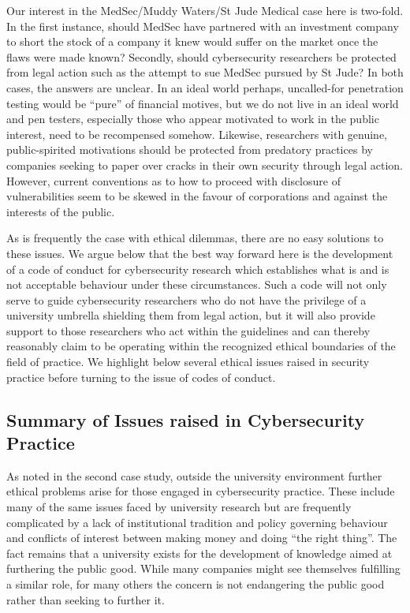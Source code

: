 \documentclass{svjour3}                     %
\begin{document}
Our interest in the MedSec/Muddy Waters/St Jude Medical case here is two-fold. In the first instance, should MedSec have partnered with an investment company to short the stock of a company it knew would suffer on the market once the flaws were made known? Secondly, should cybersecurity researchers be protected from legal action such as the attempt to sue MedSec pursued by St Jude? In both cases, the answers are unclear. In an ideal world perhaps, uncalled-for penetration testing would be “pure” of financial motives, but we do not live in an ideal world and pen testers, especially those who appear motivated to work in the public interest, need to be recompensed somehow. Likewise, researchers with genuine, public-spirited motivations should be protected from predatory practices by companies seeking to paper over cracks in their own security through legal action. However, current conventions as to how to proceed with disclosure of vulnerabilities seem to be skewed in the favour of corporations and against the interests of the public. 

As is frequently the case with ethical dilemmas, there are no easy solutions to these issues. We argue below that the best way forward here is the development of a code of conduct for cybersecurity research which establishes what is and is not acceptable behaviour under these circumstances. Such a code will not only serve to guide cybersecurity researchers who do not have the privilege of a university umbrella shielding them from legal action, but it will also provide support to those researchers who act within the guidelines and can thereby reasonably claim to be operating within the recognized ethical boundaries of the field of practice. We highlight below several ethical issues raised in security practice before turning to the issue of codes of conduct.


\subsection{Summary of Issues raised in Cybersecurity Practice}
\label{sec:industryissues}
As noted in the second case study, outside the university environment further ethical problems arise for those engaged in cybersecurity practice.  These include many of the same issues faced by university research but are frequently complicated by a lack of institutional tradition and policy governing behaviour and conflicts of interest between making money and doing “the right thing”. The fact remains that a university exists for the development of knowledge aimed at furthering the public good.  While many companies might see themselves fulfilling a similar role, for many others the concern is not endangering the public good rather than seeking to further it.
\end{document}
